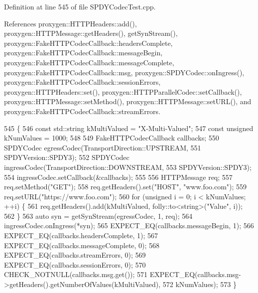 Definition at line 545 of file S\+P\+D\+Y\+Codec\+Test.\+cpp.



References proxygen\+::\+H\+T\+T\+P\+Headers\+::add(), proxygen\+::\+H\+T\+T\+P\+Message\+::get\+Headers(), get\+Syn\+Stream(), proxygen\+::\+Fake\+H\+T\+T\+P\+Codec\+Callback\+::headers\+Complete, proxygen\+::\+Fake\+H\+T\+T\+P\+Codec\+Callback\+::message\+Begin, proxygen\+::\+Fake\+H\+T\+T\+P\+Codec\+Callback\+::message\+Complete, proxygen\+::\+Fake\+H\+T\+T\+P\+Codec\+Callback\+::msg, proxygen\+::\+S\+P\+D\+Y\+Codec\+::on\+Ingress(), proxygen\+::\+Fake\+H\+T\+T\+P\+Codec\+Callback\+::session\+Errors, proxygen\+::\+H\+T\+T\+P\+Headers\+::set(), proxygen\+::\+H\+T\+T\+P\+Parallel\+Codec\+::set\+Callback(), proxygen\+::\+H\+T\+T\+P\+Message\+::set\+Method(), proxygen\+::\+H\+T\+T\+P\+Message\+::set\+U\+R\+L(), and proxygen\+::\+Fake\+H\+T\+T\+P\+Codec\+Callback\+::stream\+Errors.


\begin{DoxyCode}
545                                           \{
546   \textcolor{keyword}{const} std::string kMultiValued = \textcolor{stringliteral}{"X-Multi-Valued"};
547   \textcolor{keyword}{const} \textcolor{keywordtype}{unsigned} kNumValues = 1000;
548 
549   FakeHTTPCodecCallback callbacks;
550   SPDYCodec egressCodec(TransportDirection::UPSTREAM,
551                         SPDYVersion::SPDY3);
552   SPDYCodec ingressCodec(TransportDirection::DOWNSTREAM,
553                          SPDYVersion::SPDY3);
554   ingressCodec.setCallback(&callbacks);
555 
556   HTTPMessage req;
557   req.setMethod(\textcolor{stringliteral}{"GET"});
558   req.getHeaders().set(\textcolor{stringliteral}{"HOST"}, \textcolor{stringliteral}{"www.foo.com"});
559   req.setURL(\textcolor{stringliteral}{"https://www.foo.com"});
560   \textcolor{keywordflow}{for} (\textcolor{keywordtype}{unsigned} i = 0; i < kNumValues; ++i) \{
561     req.getHeaders().add(kMultiValued, folly::to<string>(\textcolor{stringliteral}{"Value"}, i));
562   \}
563   \textcolor{keyword}{auto} syn = getSynStream(egressCodec, 1, req);
564   ingressCodec.onIngress(*syn);
565   EXPECT\_EQ(callbacks.messageBegin, 1);
566   EXPECT\_EQ(callbacks.headersComplete, 1);
567   EXPECT\_EQ(callbacks.messageComplete, 0);
568   EXPECT\_EQ(callbacks.streamErrors, 0);
569   EXPECT\_EQ(callbacks.sessionErrors, 0);
570   CHECK\_NOTNULL(callbacks.msg.get());
571   EXPECT\_EQ(callbacks.msg->getHeaders().getNumberOfValues(kMultiValued),
572             kNumValues);
573 \}
\end{DoxyCode}
